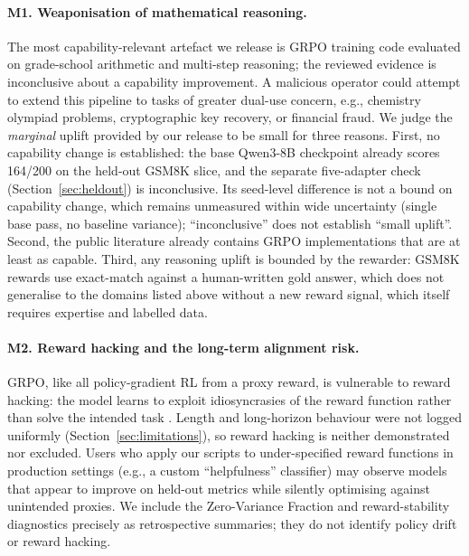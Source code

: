 \paragraph{M1. Weaponisation of mathematical reasoning.}
The most capability-relevant artefact we release is GRPO training code evaluated
on grade-school arithmetic and multi-step reasoning; the reviewed evidence is
inconclusive about a capability improvement. A malicious
operator could attempt to extend this pipeline to tasks of greater
dual-use concern, e.g., chemistry olympiad problems, cryptographic key
recovery, or financial fraud. We judge the \emph{marginal} uplift provided
by our release to be small for three reasons. First, no capability change is
established: the base Qwen3-8B checkpoint already scores 164/200 on the
held-out GSM8K slice, and the separate five-adapter check
(Section~\ref{sec:heldout}) is inconclusive. Its seed-level difference is not
a bound on capability change, which remains unmeasured within wide uncertainty
(single base pass, no baseline variance); ``inconclusive'' does not establish
``small uplift''.
Second, the public literature already contains GRPO implementations
\cite{shao2024deepseekmath, openrlhf2024, verl2024, vonwerra2022trl} that are at
least as capable. Third, any reasoning uplift is bounded by the rewarder:
GSM8K rewards use exact-match against a human-written gold answer, which
does not generalise to the domains listed above without a new reward
signal, which itself requires expertise and labelled data.

\paragraph{M2. Reward hacking and the long-term alignment risk.}
GRPO, like all policy-gradient RL from a proxy reward, is vulnerable to
reward hacking: the model learns to exploit idiosyncrasies of the reward
function rather than solve the intended task \cite{skalse2022specificationgaming,
krakovna2020specification}. Length and long-horizon
behaviour were not logged uniformly (Section~\ref{sec:limitations}), so reward
hacking is neither demonstrated nor excluded.
Users who apply our scripts to under-specified reward functions in
production settings (e.g., a custom ``helpfulness'' classifier) may observe
models that appear to improve on held-out metrics while silently
optimising against unintended proxies. We include the Zero-Variance
Fraction and reward-stability diagnostics precisely as retrospective summaries; they do not identify policy drift or reward hacking.

